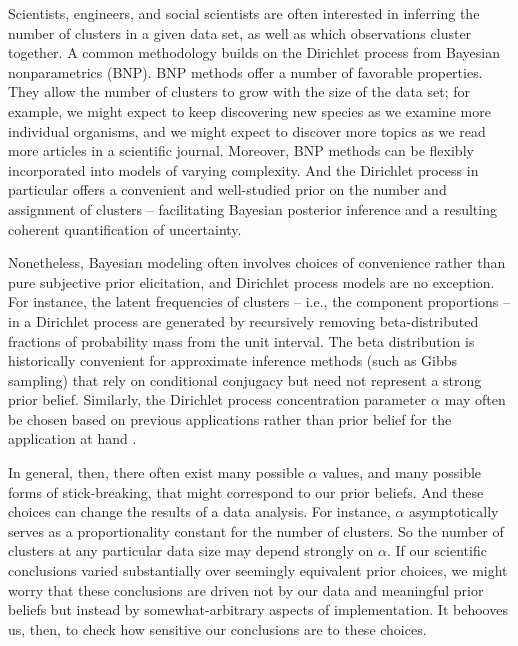 Scientists, engineers, and social scientists are often interested in inferring
the number of clusters in a given data set, as well as which observations
cluster together. A common methodology builds on the Dirichlet process
\citep{ferguson:1973:bayesian, sethuraman:1994:constructivedp} from Bayesian
nonparametrics (BNP). BNP methods offer a number of favorable properties. They
allow the number of clusters to grow with the size of the data set; for example,
we might expect to keep discovering new species as we examine more individual
organisms, and we might expect to discover more topics as we read more articles
in a scientific journal. Moreover, BNP methods can be flexibly incorporated into
models of varying complexity. And the Dirichlet process in particular offers a
convenient and well-studied prior on the number and assignment of clusters --
facilitating Bayesian posterior inference and a resulting coherent
quantification of uncertainty.

Nonetheless, Bayesian modeling often involves choices of convenience rather than
pure subjective prior elicitation, and Dirichlet process models are no
exception. For instance, the latent frequencies of clusters -- i.e., the
component proportions -- in a Dirichlet process are generated by recursively
removing beta-distributed fractions of probability mass from the unit interval.
The beta distribution is historically convenient for approximate inference
methods (such as Gibbs sampling) that rely on conditional conjugacy but need not
represent a strong prior belief. Similarly, the Dirichlet process concentration
parameter $\alpha$ may often be chosen based on previous applications rather
than prior belief for the application at hand
\citep[Chapter 23]{teh:2006:hdp, gelman:2013:bda}.

In general, then, there often exist many possible $\alpha$ values, and many
possible forms of stick-breaking, that might correspond to our prior beliefs.
And these choices can change the results of a data analysis. For instance,
$\alpha$ asymptotically serves as a proportionality constant for the number of
clusters. So the number of clusters at any particular data size may depend
strongly on $\alpha$. If our scientific conclusions varied substantially over
seemingly equivalent prior choices, we might worry that these conclusions are
driven not by our data and meaningful prior beliefs but instead by
somewhat-arbitrary aspects of implementation. It behooves us, then, to check how
sensitive our conclusions are to these choices.

